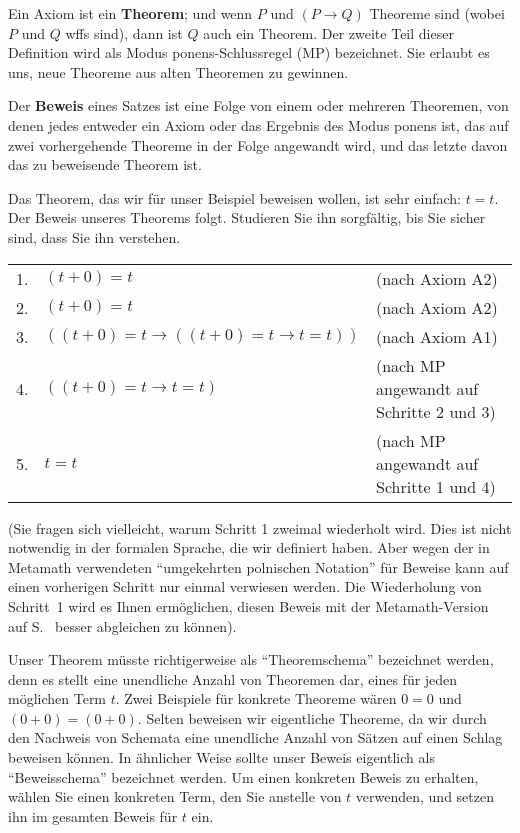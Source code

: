 Ein Axiom ist ein {\bf Theorem}; und wenn $P$ und $(P\rightarrow Q)$ Theoreme sind (wobei $P$ und $Q$ wffs sind), dann ist $Q$ auch ein Theorem. Der zweite Teil dieser Definition wird als Modus ponens-Schlussregel (MP) bezeichnet.  Sie erlaubt es uns, neue Theoreme aus alten Theoremen zu gewinnen.

Der {\bf Beweis} eines Satzes ist eine Folge von einem oder mehreren
Theoremen, von denen jedes entweder ein Axiom oder das Ergebnis des Modus ponens ist, das auf zwei vorhergehende Theoreme in der Folge angewandt wird, und das letzte davon das zu beweisende Theorem ist.

Das Theorem, das wir für unser Beispiel beweisen wollen, ist sehr einfach: $ t=t$.  Der Beweis unseres Theorems folgt.  Studieren Sie ihn sorgfältig, bis Sie sicher sind, dass Sie ihn verstehen.\label{zeroproof}

\begin{tabu} { l X X }
1. & $(t+0)=t$ & (nach Axiom A2) \\
2. & $(t+0)=t$ & (nach Axiom A2) \\
3. & $((t+0)=t \rightarrow ((t+0)=t\rightarrow t=t))$ & (nach Axiom A1) \\
4. & $((t+0)=t\rightarrow t=t)$ & (nach MP angewandt auf Schritte 2 und 3) \\
5. & $t=t$ & (nach MP angewandt auf Schritte 1 und 4) \\
\end{tabu}

(Sie fragen sich vielleicht, warum Schritt 1 zweimal wiederholt wird.  Dies ist nicht notwendig in der formalen Sprache, die wir definiert haben. Aber wegen der in Metamath verwendeten "`umgekehrten polnischen Notation"' für Beweise kann auf einen vorherigen Schritt nur einmal verwiesen werden.  Die Wiederholung von Schritt~1 wird es Ihnen ermöglichen, diesen Beweis mit der Metamath-Version auf S.~\pageref{demoproof} besser abgleichen zu können).

Unser Theorem müsste richtigerweise  als "`Theoremschema"' bezeichnet werden, denn es stellt eine unendliche Anzahl von Theoremen dar, eines für jeden möglichen Term $ t$.  Zwei Beispiele für konkrete Theoreme wären $0=0$ und $(0+0)=(0+0)$.  Selten beweisen wir eigentliche Theoreme, da wir durch den Nachweis von Schemata eine unendliche Anzahl von Sätzen auf einen Schlag beweisen können.  In ähnlicher Weise sollte unser Beweis eigentlich als "`Beweisschema"' bezeichnet werden.  Um einen konkreten Beweis zu erhalten, wählen Sie einen konkreten Term, den Sie anstelle von $ t$ verwenden, und setzen ihn im gesamten Beweis für $ t$ ein.

